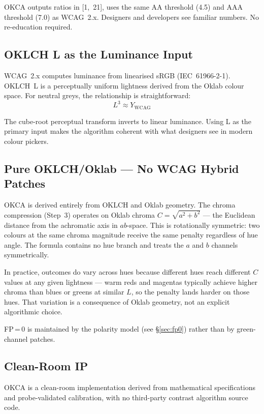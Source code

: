 \documentclass[11pt,a4paper]{article}
\begin{document}
OKCA outputs ratios in [1,~21], uses the same AA threshold (4.5) and
AAA threshold (7.0) as WCAG~2.x.  Designers and developers see familiar
numbers.  No re-education required.

\subsection{OKLCH L as the Luminance Input}

WCAG~2.x computes luminance from linearised sRGB (IEC~61966-2-1).
OKLCH~L is a perceptually uniform lightness derived from the Oklab
colour space.  For neutral greys, the relationship is straightforward:
\[
  L^3 \approx Y_{\text{WCAG}}
\]

The cube-root perceptual transform inverts to linear luminance.  Using L
as the primary input makes the algorithm coherent with what designers see
in modern colour pickers.

\subsection{Pure OKLCH/Oklab --- No WCAG Hybrid Patches}

OKCA is derived entirely from OKLCH and Oklab geometry.  The chroma
compression (Step~3) operates on Oklab chroma
$C = \sqrt{a^2 + b^2}$ --- the Euclidean distance from the achromatic
axis in $ab$-space.  This is rotationally symmetric: two colours at the
same chroma magnitude receive the same penalty regardless of hue angle.
The formula contains no hue branch and treats the $a$ and $b$ channels
symmetrically.

In practice, outcomes do vary across hues because different hues reach
different $C$ values at any given lightness --- warm reds and magentas
typically achieve higher chroma than blues or greens at similar $L$, so
the penalty lands harder on those hues.  That variation is a consequence
of Oklab geometry, not an explicit algorithmic choice.

FP\,=\,0 is maintained by the polarity model (see \S\ref{sec:fp0})
rather than by green-channel patches.

\subsection{Clean-Room IP}

OKCA is a clean-room implementation derived from mathematical
specifications and probe-validated calibration, with no third-party
contrast algorithm source code.
\end{document}
